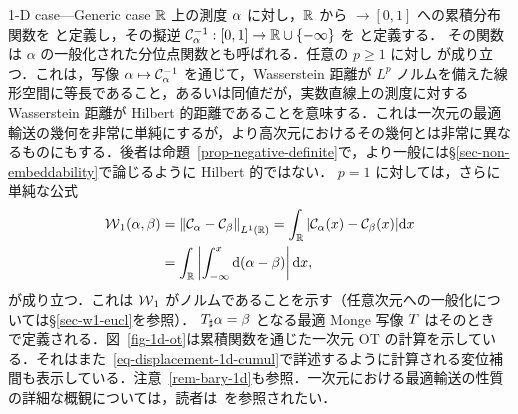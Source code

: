 \begin{rem2}{1-D case---Generic case}\label{rem-1d-ot-generic}
$\mathbb{R}$ 上の測度 $\alpha$ に対し，$\mathbb{R}$ から $\rightarrow [0,1]$ への累積分布関数を
と定義し，その擬逆 $\mathcal{C}_{\alpha}^{-1} : [0,1] \rightarrow \mathbb{R} \cup \{-\infty\}$ を
と定義する．
%
その関数は $\alpha$ の一般化された分位点関数とも呼ばれる．任意の $p \geq 1$ に対し
が成り立つ．これは，写像 $\alpha \mapsto \mathcal{C}_{\alpha}^{-1}$ を通じて，Wasserstein 距離が $L^p$ ノルムを備えた線形空間に等長であること，あるいは同値だが，実数直線上の測度に対する Wasserstein 距離が Hilbert 的距離であることを意味する．これは一次元の最適輸送の幾何を非常に単純にするが，より高次元におけるその幾何とは非常に異なるものにもする．後者は命題~\ref{prop-negative-definite}で，より一般には\S\ref{sec-non-embeddability}で論じるように Hilbert 的ではない．
%
$p=1$ に対しては，さらに単純な公式
\begin{align}\label{eq-w1-1d}
	\operatorname{\mathcal{W}}_1(\alpha,\beta) &= \left\|  \mathcal{C}_{\alpha} - \mathcal{C}_{\beta}  \right\|_{L^1(\mathbb{R})} =
	\int_{\mathbb{R}} | \mathcal{C}_{\alpha}(x) - \mathcal{C}_{\beta}(x) | \mathrm{d} x \\
	&= \int_{\mathbb{R}} \left\lvert \int_{-\infty}^x \mathrm{d}(\alpha-\beta) \right\rvert \mathrm{d} x,
\end{align}
が成り立つ．これは $\operatorname{\mathcal{W}}_1$ がノルムであることを示す（任意次元への一般化については\S\ref{sec-w1-eucl}を参照）．
%
$T_\sharp \alpha=\beta$ となる最適 Monge 写像 $T$ はそのとき
で定義される．図~\ref{fig-1d-ot}は累積関数を通じた一次元 OT の計算を示している．それはまた~\eqref{eq-displacement-1d-cumul}で詳述するように計算される変位補間も表示している．注意~\ref{rem-bary-1d}も参照．一次元における最適輸送の性質の詳細な概観については，読者は~\cite[Chapter 2]{SantambrogioBook}を参照されたい．
\end{rem2}



